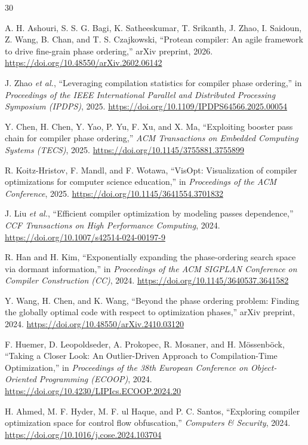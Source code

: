 \documentclass[conference]{IEEEtran}
\begin{document}
\begin{thebibliography}{30}

A. H. Ashouri, S. S. G. Bagi, K. Satheeskumar, T. Srikanth, J. Zhao, I. Saidoun, Z. Wang, B. Chan, and T. S. Czajkowski, 
``Protean compiler: An agile framework to drive fine-grain phase ordering,'' 
arXiv preprint, 2026.
\url{https://doi.org/10.48550/arXiv.2602.06142}

J. Zhao \textit{et al.}, 
``Leveraging compilation statistics for compiler phase ordering,'' 
in \textit{Proceedings of the IEEE International Parallel and Distributed Processing Symposium (IPDPS)}, 2025.
\url{https://doi.org/10.1109/IPDPS64566.2025.00054}

Y. Chen, H. Chen, Y. Yao, P. Yu, F. Xu, and X. Ma, 
``Exploiting booster pass chain for compiler phase ordering,'' 
\textit{ACM Transactions on Embedded Computing Systems (TECS)}, 2025.
\url{https://doi.org/10.1145/3755881.3755899}

R. Koitz-Hristov, F. Mandl, and F. Wotawa, 
``VisOpt: Visualization of compiler optimizations for computer science education,'' 
in \textit{Proceedings of the ACM Conference}, 2025.
\url{https://doi.org/10.1145/3641554.3701832}

J. Liu \textit{et al.}, 
``Efficient compiler optimization by modeling passes dependence,'' 
\textit{CCF Transactions on High Performance Computing}, 2024.
\url{https://doi.org/10.1007/s42514-024-00197-9}

R. Han and H. Kim, 
``Exponentially expanding the phase-ordering search space via dormant information,'' 
in \textit{Proceedings of the ACM SIGPLAN Conference on Compiler Construction (CC)}, 2024.
\url{https://doi.org/10.1145/3640537.3641582}

Y. Wang, H. Chen, and K. Wang, 
``Beyond the phase ordering problem: Finding the globally optimal code with respect to optimization phases,'' 
arXiv preprint, 2024.
\url{https://doi.org/10.48550/arXiv.2410.03120}

F. Huemer, D. Leopoldseder, A. Prokopec, R. Mosaner, and H. Mössenböck, 
``Taking a Closer Look: An Outlier-Driven Approach to Compilation-Time Optimization,'' 
in \textit{Proceedings of the 38th European Conference on Object-Oriented Programming (ECOOP)}, 2024.
\url{https://doi.org/10.4230/LIPIcs.ECOOP.2024.20}

H. Ahmed, M. F. Hyder, M. F. ul Haque, and P. C. Santos, 
``Exploring compiler optimization space for control flow obfuscation,'' 
\textit{Computers \& Security}, 2024.
\url{https://doi.org/10.1016/j.cose.2024.103704}


\end{thebibliography}
\end{document}
